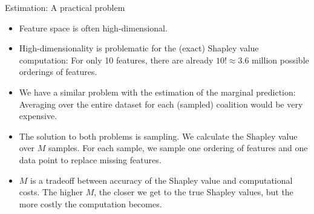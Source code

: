 \documentclass[11pt,compress,t,notes=noshow, xcolor=table]{beamer}
\begin{document}
\begin{vbframe}{Estimation: A practical problem}
  \begin{itemize}
      \item Feature space is often high-dimensional.
      \item High-dimensionality is problematic for the (exact) Shapley value computation: For only 10 features, there are already $10! \approx 3.6$ million possible orderings of features.
      \item We have a similar problem with the estimation of the marginal prediction: Averaging over the entire dataset for each (sampled) coalition would be very expensive.
      \item The solution to both problems is sampling. We calculate the Shapley value over $M$ samples. For each sample, we sample one ordering of features and one data point to replace missing features.
      \item $M$ is a tradeoff between accuracy of the Shapley value and computational costs. The higher $M$, the closer we get to the true Shapley values, but the more costly the computation becomes.  
  \end{itemize}      
\end{vbframe}
\end{document}
